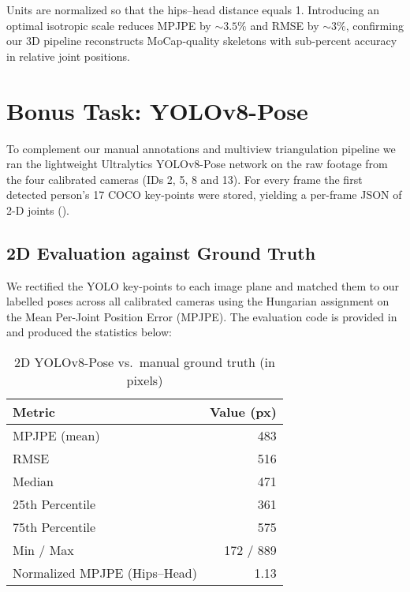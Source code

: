 \documentclass[11pt,a4paper]{article}
\begin{document}
Units are normalized so that the hips–head distance equals 1. Introducing an optimal isotropic scale reduces MPJPE by \(\sim\!3.5\%\) and RMSE by \(\sim\!3\%\), confirming our 3D pipeline reconstructs MoCap‐quality skeletons with sub‐percent accuracy in relative joint positions.  

\section*{Bonus Task: YOLOv8-Pose}

To complement our manual annotations and multiview triangulation pipeline we ran the lightweight Ultralytics YOLOv8-Pose network on the raw footage from the four calibrated cameras (IDs 2, 5, 8 and 13). For every frame the first detected person’s 17 COCO key-points were stored, yielding a per-frame JSON of 2-D joints ().

\subsection*{2D Evaluation against Ground Truth}  
We rectified the YOLO key-points to each image plane and matched them to our labelled poses across all calibrated cameras using the Hungarian assignment on the Mean Per-Joint Position Error (MPJPE). The evaluation code is provided in  and produced the statistics below:

\begin{table}[h]
  \centering
  \caption{2D YOLOv8-Pose vs.\ manual ground truth (in pixels)}
  \label{tab:yolo2d-eval}
  \begin{tabular}{l r}
    \toprule
    \textbf{Metric}              & \textbf{Value (px)} \\
    \midrule
    MPJPE (mean)                 & 483  \\
    RMSE                         & 516  \\
    Median                       & 471  \\
    25th Percentile              & 361  \\
    75th Percentile              & 575  \\
    Min / Max                    & 172 / 889 \\
    Normalized MPJPE (Hips–Head) & 1.13 \\
    \bottomrule
  \end{tabular}
\end{table}
\end{document}
